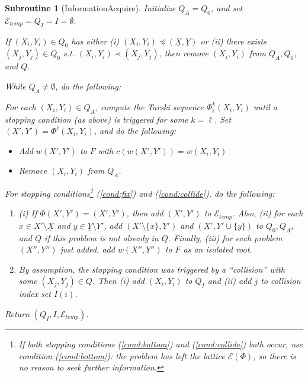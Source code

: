 \documentclass[11pt,reqno]{amsart}
\newtheorem{subroutine}[thm]{Subroutine}
\theoremstyle{definition}
\numberwithin{equation}{section}
\newcommand{\ul}{\underline}
\newcommand{\fix}{\mathcal{E}}
\newcommand{\peq}{\preceq}
\newcommand{\pe}{\prec}
\newcommand{\acto}{Q_0}
\newcommand{\acta}{Q_A}
\newcommand{\actc}{Q_I}
\newcommand{\act}{Q}
\newcommand{\coll}{I}
\newcommand{\forest}{F}
\newcommand{\fixtemp}{\mathcal{E}_{temp}}
\newcommand{\botx}{\ul{X}}
\newcommand{\boty}{\ul{Y}}
\newcommand{\pairi}{(X_i,Y_i)}
\newcommand{\pairp}{(X',Y')}
\begin{document}
\begin{subroutine}[InformationAcquire] \label{sub:infac2}
Initialize $\acta = \acto$, and set $\fixtemp = \actc = \coll = \emptyset$.

If $(X_i,Y_i) \in \acto$ has either (i) $(X_i, Y_i) \peq (\botx,\boty)$ or (ii) there exists $(X_j, Y_j) \in \acto$ s.t. $(X_i,Y_i) \pe (X_j,Y_j)$, then remove $(X_i,Y_i)$ from $\acta, \acto$, and $\act$.

While $\acta \not = \emptyset$, do the following:

For each $\pairi \in \acta$, compute the Tarski sequence $\Phi_i^k \pairi$ until a stopping condition (as above) is triggered for some $k = \ell$. 
Set $\pairp = \Phi^{\ell}\pairi$, and do the following:
\begin{itemize}
\item[(a)] Add $w\pairp$ to $\forest$ with $c(w\pairp) = w\pairi$ 
\item[(b)] Remove $\pairi$ from $\acta$. 
\end{itemize}
For stopping conditions\footnote{If both stopping conditions (\ref{cond:bottom}) and (\ref{cond:collide}) both occur, use condition (\ref{cond:bottom}): the problem has left the lattice $\fix(\Phi)$, so there is no reason to seek further information.} (\ref{cond:fix}) and (\ref{cond:collide}), do the following:
\begin{enumerate}
\item[(\ref{cond:fix})] (i) If $\Phi \pairp = \pairp$, then add $\pairp$ to $\fixtemp$. 
Also, (ii) for each $x \in X' \setminus \botx$ and $y \in \boty \setminus Y'$, add $(X' \setminus \{x\}, Y')$ and $(X', Y' \cup \{y \})$ to $\acto, \acta$, and $\act$ if this problem is not already in $\act$.
Finally, (iii) for each problem $(X'',Y'')$ just added, add $w(X'',Y'')$ to $\forest$ as an isolated root.
\item[(\ref{cond:collide})] By assumption, the stopping condition was triggered by a ``collision'' with some $(X_j,Y_j) \in \act$.
Then (i) add $\pairi$ to $\actc$ and (ii) add $j$ to collision index set $\coll(i)$. 
\end{enumerate}

Return $(\actc, \coll, \fixtemp)$.
\end{subroutine}
\end{document}
